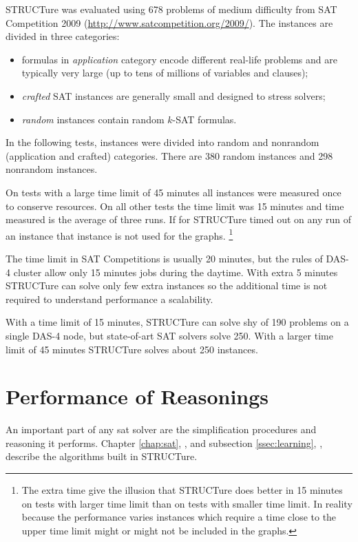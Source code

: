 STRUCTure was evaluated using 678 problems
of medium difficulty from SAT Competition 2009
(\url{http://www.satcompetition.org/2009/}). The instances are
divided in three categories:
\begin{itemize}
  \item formulas in \emph{application} category encode different
  real-life problems and are typically very large (up to tens of
  millions of variables and clauses);
  \item \emph{crafted} SAT instances are generally small and designed
  to stress solvers;
  \item \emph{random} instances contain random $k$-SAT formulas.
\end{itemize}

In the following tests, instances were divided into random and
nonrandom (application and crafted) categories. There are 380 random
instances and 298 nonrandom instances.

On tests with a large time limit of 45 minutes all instances were
measured once to conserve resources. On all other tests the time
limit was 15 minutes and time measured is the average of three runs.
If for STRUCTure timed out on any run of an instance that instance
is not used for the graphs.  \footnote{The extra time give
the illusion that STRUCTure does better in 15 minutes on tests
with larger time limit than on tests with smaller time limit.
In reality because the performance varies instances which require
a time close to the upper time limit might or might not be included
in the graphs.}

The time limit in SAT Competitions is usually 20 minutes, but
the rules of DAS-4 cluster allow only 15 minutes jobs during the
daytime.  With extra 5 minutes STRUCTure can solve only few extra
instances so the additional time is not required to understand
performance a scalability.

With a time limit of 15 minutes, STRUCTure can solve shy of 190
problems on a single DAS-4 node, but state-of-art SAT solvers solve
250. With a larger time limit of 45 minutes STRUCTure solves about
250 instances.


\section{Performance of Reasonings}


An important part of any sat solver are the simplification
procedures and reasoning it performs. Chapter \ref{chap:sat},
, and subsection \ref{ssec:learning},
, describe the algorithms built in STRUCTure.

